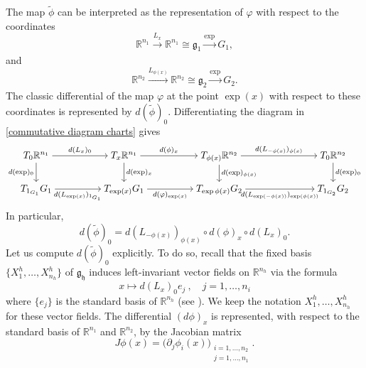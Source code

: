 \documentclass[dvipsnames]{amsart}
\theoremstyle{definition}
\theoremstyle{definition}
\numberwithin{equation}{section}
\begin{document}
The map $\widetilde{\phi}$ can be interpreted as the representation of $\varphi$ with respect to the coordinates
\begin{equation*}
    \mathbb{R}^{n_1} \xrightarrow[]{L_x} \mathbb{R}^{n_1}\cong \mathfrak{g}_1 \xrightarrow[]{\exp} G_1 ,
\end{equation*}
and 
\begin{equation*}
    \mathbb{R}^{n_2} \xrightarrow[]{L_{\phi(x)}} \mathbb{R}^{n_2} \cong \mathfrak{g}_2 \xrightarrow[]{\exp} G_2.
\end{equation*}
The classic differential of the map $\varphi$ at the point $\exp(x)$ with respect to these coordinates is represented by $d(\widetilde{\phi})_0$. Differentiating the diagram in \eqref{commutative diagram charts} gives
\[\begin{tikzcd}[ampersand replacement=\&,cramped]
	{T_0\mathbb{R}^{n_1}} \&\& {T_x\mathbb{R}^{n_1}} \&\& {T_{\phi(x)}\mathbb{R}^{n_2}} \&\&\& {T_0\mathbb{R}^{n_2}} \\
	{T_{1_{G_1}}G_1} \&\& {T_{\exp(x)}G_1} \&\& {T_{\exp{\phi(x)}}G_2} \&\&\& {T_{1_{G_2}}G_2}
	\arrow["{d(L_x)_0}", from=1-1, to=1-3]
	\arrow["{d(\exp)_0}"', from=1-1, to=2-1]
	\arrow["{d(\phi)_x}", from=1-3, to=1-5]
	\arrow["{d(\exp)_x}", from=1-3, to=2-3]
	\arrow["{d(L_{-\phi(x)})_{\phi(x)}}", from=1-5, to=1-8]
	\arrow["{d(\exp)_{\phi(x)}}", from=1-5, to=2-5]
	\arrow["{d(\exp)_0}", from=1-8, to=2-8]
	\arrow["{d(L_{\exp(x)})_{1_{G_1}}}"', from=2-1, to=2-3]
	\arrow["{d(\varphi)_{\exp(x)}}"', from=2-3, to=2-5]
	\arrow["{d(L_{\exp(-\phi(x))})_{\exp(\phi(x))}}"', from=2-5, to=2-8]
\end{tikzcd}\]
In particular, 
\begin{equation*}
 d(\widetilde{\phi})_{0} = d(L_{-\phi(x)})_{\phi(x)} \circ d(\phi)_x \circ d(L_x)_0.
\end{equation*}
Let us compute $d(\widetilde{\phi})_{0}$ explicitly. To do so, recall that the fixed basis $\{X_1^h, \dots, X_{n_h}^h\}$ of $\mathfrak{g_h}$ induces left-invariant vector fields on $\mathbb{R}^{n_h}$ via the formula
\begin{equation*}
    x \mapsto d(L_x)_0 e_j\ , \quad j = 1, \dots, n_i
\end{equation*}
where $\{e_j\}$ is the standard basis of $\mathbb{R}^{n_h}$ (see \cite{LeDonneTripaldi2021}). We keep the notation $X_1^h, \dots, X_{n_h}^h$ for these vector fields.
The differential $(d\phi)_x$ is represented, with respect to the standard basis of $\mathbb R^{n_1}$ and $\mathbb R^{n_2}$, by the Jacobian matrix
\begin{equation*}
    J\phi(x) = \Big ( \partial_j \phi_i(x) \Big)_{ \substack{ i=1, \dots, n_2 \\ j=1, \dots, n_1 } }.
\end{equation*}
\end{document}
